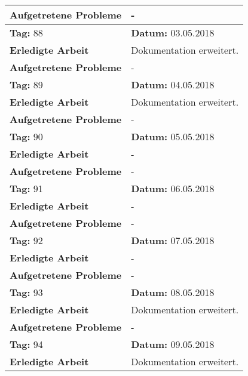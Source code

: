 \begin{longtable}{|p{5cm}|p{5cm}p{6cm}|}
\textbf{Aufgetretene Probleme} & \multicolumn{2}{p{11cm}|}{-} \\ \hline
\rowcolor{heading}\textbf{Tag:} 88 & \textbf{Datum:} 03.05.2018 & \\ \hline
\textbf{Erledigte Arbeit} & \multicolumn{2}{p{11cm}|}{Dokumentation erweitert.} \\ \hline
\textbf{Aufgetretene Probleme} & \multicolumn{2}{p{11cm}|}{-} \\ \hline
\rowcolor{heading}\textbf{Tag:} 89 & \textbf{Datum:} 04.05.2018 & \\ \hline
\textbf{Erledigte Arbeit} & \multicolumn{2}{p{11cm}|}{Dokumentation erweitert.} \\ \hline
\textbf{Aufgetretene Probleme \newline \newline \newline \newline \newline } & \multicolumn{2}{p{11cm}|}{-} \\ \hline
\rowcolor{heading}\textbf{Tag:} 90 & \textbf{Datum:} 05.05.2018 & \\ \hline
\textbf{Erledigte Arbeit} & \multicolumn{2}{p{11cm}|}{-} \\ \hline
\textbf{Aufgetretene Probleme } & \multicolumn{2}{p{11cm}|}{-} \\ \hline
\rowcolor{heading}\textbf{Tag:} 91 & \textbf{Datum:} 06.05.2018 & \\ \hline
\textbf{Erledigte Arbeit} & \multicolumn{2}{p{11cm}|}{-} \\ \hline
\textbf{Aufgetretene Probleme} & \multicolumn{2}{p{11cm}|}{-} \\ \hline
\rowcolor{heading}\textbf{Tag:} 92 & \textbf{Datum:} 07.05.2018 & \\ \hline
\textbf{Erledigte Arbeit} & \multicolumn{2}{p{11cm}|}{-} \\ \hline
\textbf{Aufgetretene Probleme} & \multicolumn{2}{p{11cm}|}{-} \\ \hline
\rowcolor{heading}\textbf{Tag:} 93 & \textbf{Datum:} 08.05.2018 & \\ \hline
\textbf{Erledigte Arbeit} & \multicolumn{2}{p{11cm}|}{Dokumentation erweitert.} \\ \hline
\textbf{Aufgetretene Probleme} & \multicolumn{2}{p{11cm}|}{-} \\ \hline
\rowcolor{heading}\textbf{Tag:} 94 & \textbf{Datum:} 09.05.2018 & \\ \hline
\textbf{Erledigte Arbeit} & \multicolumn{2}{p{11cm}|}{Dokumentation erweitert.} \\ \hline

\end{longtable}
